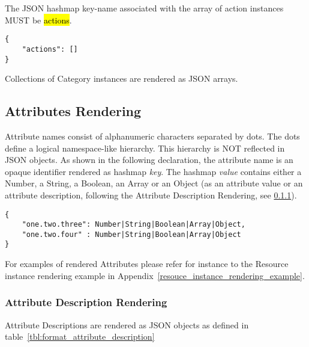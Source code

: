 \documentclass[10pt,a4paper]{article}
\begin{document}
The JSON hashmap key-name associated with the array of action instances MUST be \hl{actions}.

\begin{lstlisting}
{
    "actions": []
}
\end{lstlisting}


Collections of Category instances are rendered as JSON arrays.

\subsection{Attributes Rendering}

Attribute names consist of alphanumeric characters separated by dots. The dots
define a logical namespace-like hierarchy. This hierarchy is NOT reflected in JSON
objects. As shown in the following declaration, the attribute name is an opaque
identifier rendered as hashmap \textit{key}. The hashmap \textit{value} contains either a
Number, a String, a Boolean, an Array or an Object (as an attribute value or an attribute
description, following the Attribute Description Rendering, see \ref{sec:format_attribute_description}).
\begin{lstlisting}
{
    "one.two.three": Number|String|Boolean|Array|Object,
    "one.two.four" : Number|String|Boolean|Array|Object
}
\end{lstlisting}

For examples of rendered Attributes please refer for instance to the Resource instance
rendering example in Appendix~\ref{resouce_instance_rendering_example}.


\subsubsection{Attribute Description Rendering}
\label{sec:format_attribute_description}

Attribute Descriptions are rendered as JSON objects as defined in table~\ref{tbl:format_attribute_description}
\end{document}
